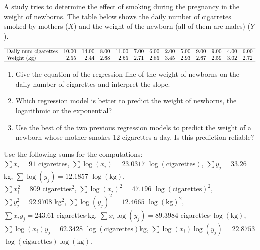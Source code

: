 {A study tries to determine the effect of smoking during the pregnancy in the weight of newborns. The table below shows the daily number of cigarretes smoked by mothers ($X$) and the weight of the newborn
(all of them are males) ($Y$).

\[
\begin{array}{lrrrrrrrrrrrr}
   \hline
\mbox{Daily num cigarettes} & 10.00 & 14.00 & 8.00 & 11.00 & 7.00 & 6.00 & 2.00 & 5.00 & 9.00 & 9.00 & 4.00 & 6.00 \\ 
  \mbox{Weight (kg)} & 2.55 & 2.44 & 2.68 & 2.65 & 2.71 & 2.85 & 3.45 & 2.93 & 2.67 & 2.59 & 3.02 & 2.72 \\ 
   \hline
\end{array}
\]

\begin{enumerate}
\item Give the equation of the regression line of the weight of newborns on the daily number of cigarettes and interpret the slope.
\item Which regression model is better to predict the weight of newborns, the logarithmic or the exponential?
\item Use the best of the two previous regression models to predict the weight of a newborn whose mother smokes 12 cigarettes a day. Is this prediction reliable?
\end{enumerate}

Use the following sums for the computations:\\
$\sum x_i=91$ cigarettes, $\sum \log(x_i)=23.0317$
$\log(\mbox{cigarettes})$, $\sum y_j=33.26$ kg,
$\sum \log(y_j)=12.1857$ $\log(\mbox{kg})$,\\
$\sum x_i^2=809$ cigarettes$^2$, $\sum \log(x_i)^2=47.196$
$\log(\mbox{cigarettes})^2$, $\sum y_j^2=92.9708$ kg$^2$,
$\sum \log(y_j)^2=12.4665$ $\log(\mbox{kg})^2$,\\
$\sum x_iy_j=243.61$ cigarettes$\cdot$kg,
$\sum x_i\log(y_j)=89.3984$ cigarettes$\cdot\log(\mbox{kg})$,
$\sum \log(x_i)y_j=62.3428$ $\log(\mbox{cigarettes})$kg,
$\sum \log(x_i)\log(y_j)=22.8753$
$\log(\mbox{cigarettes})\log(\mbox{kg})$.
}
